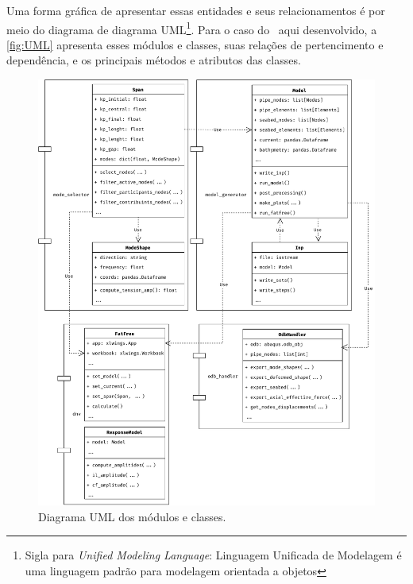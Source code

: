 Uma forma gráfica de apresentar essas entidades e seus relacionamentos é por meio do diagrama de diagrama UML\footnote{Sigla para \textit{Unified Modeling Language}: Linguagem Unificada de Modelagem é uma linguagem padrão para modelagem orientada a objetos}\cite{infoescolauml}. Para o caso do \frame\ aqui desenvolvido, a \autoref{fig:UML} apresenta esses módulos e classes, suas relações de pertencimento e dependência, e os principais métodos e atributos das classes.

\begin{figure}[!ht]
    \centering
    \caption{Diagrama UML dos módulos e classes.}\label{fig:UML}
    \includegraphics[width=\textwidth]{imagens/UML}
\end{figure}
